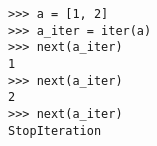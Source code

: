\begin{lstlisting}
>>> a = [1, 2]
>>> a_iter = iter(a)
>>> next(a_iter)
1
>>> next(a_iter)
2
>>> next(a_iter)
StopIteration
\end{lstlisting}